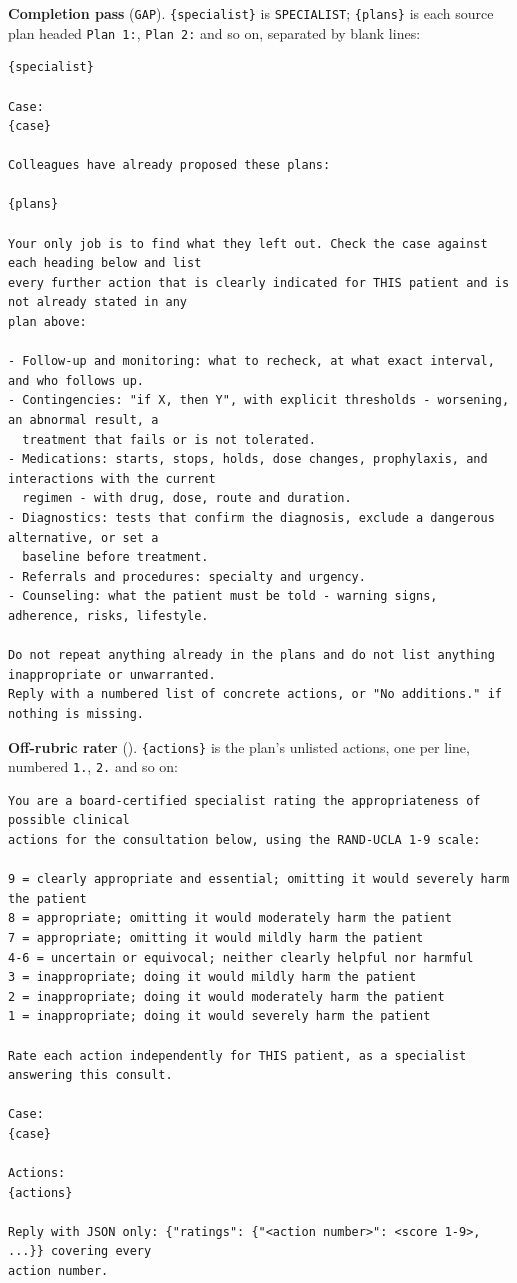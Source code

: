 \documentclass[11pt]{article}
\newcommand{\mainsec}[1]{\emph{\nameref{#1}}}
\begin{document}
\textbf{Completion pass} (\texttt{GAP}). \texttt{\{specialist\}} is \texttt{SPECIALIST};
\texttt{\{plans\}} is each source plan headed \texttt{Plan 1:}, \texttt{Plan 2:} and so on, separated
by blank lines:
\begin{lstlisting}
{specialist}

Case:
{case}

Colleagues have already proposed these plans:

{plans}

Your only job is to find what they left out. Check the case against each heading below and list
every further action that is clearly indicated for THIS patient and is not already stated in any
plan above:

- Follow-up and monitoring: what to recheck, at what exact interval, and who follows up.
- Contingencies: "if X, then Y", with explicit thresholds - worsening, an abnormal result, a
  treatment that fails or is not tolerated.
- Medications: starts, stops, holds, dose changes, prophylaxis, and interactions with the current
  regimen - with drug, dose, route and duration.
- Diagnostics: tests that confirm the diagnosis, exclude a dangerous alternative, or set a
  baseline before treatment.
- Referrals and procedures: specialty and urgency.
- Counseling: what the patient must be told - warning signs, adherence, risks, lifestyle.

Do not repeat anything already in the plans and do not list anything inappropriate or unwarranted.
Reply with a numbered list of concrete actions, or "No additions." if nothing is missing.
\end{lstlisting}

\textbf{Off-rubric rater} (\mainsec{sec:outcomes}). \texttt{\{actions\}} is the plan's unlisted
actions, one per line, numbered \texttt{1.}, \texttt{2.} and so on:
\begin{lstlisting}
You are a board-certified specialist rating the appropriateness of possible clinical
actions for the consultation below, using the RAND-UCLA 1-9 scale:

9 = clearly appropriate and essential; omitting it would severely harm the patient
8 = appropriate; omitting it would moderately harm the patient
7 = appropriate; omitting it would mildly harm the patient
4-6 = uncertain or equivocal; neither clearly helpful nor harmful
3 = inappropriate; doing it would mildly harm the patient
2 = inappropriate; doing it would moderately harm the patient
1 = inappropriate; doing it would severely harm the patient

Rate each action independently for THIS patient, as a specialist answering this consult.

Case:
{case}

Actions:
{actions}

Reply with JSON only: {"ratings": {"<action number>": <score 1-9>, ...}} covering every
action number.
\end{lstlisting}
\end{document}
